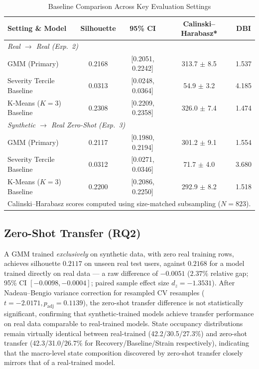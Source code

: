 \documentclass[conference]{IEEEtran}
\begin{document}
\begin{table}[!htb]
\caption{Baseline Comparison Across Key Evaluation Settings}
\label{tab:baselines}
\centering
\small
\setlength{\tabcolsep}{3pt}
\begin{tabular}{lcccc}
\toprule
\textbf{Setting \& Model} & \textbf{Silhouette} & \textbf{95\% CI} & \textbf{Calinski--Harabasz*} & \textbf{DBI} \\
\midrule
\multicolumn{5}{l}{\textit{Real $\rightarrow$ Real (Exp.~2)}} \\
GMM (Primary) & 0.2168 & [0.2051, 0.2242] & 313.7 $\pm$ 8.5 & 1.537 \\
Severity Tercile Baseline & 0.0313 & [0.0248, 0.0364] & 54.9 $\pm$ 3.2 & 4.185 \\
K-Means ($K{=}3$) Baseline & 0.2308 & [0.2209, 0.2358] & 326.0 $\pm$ 7.4 & 1.474 \\
\midrule
\multicolumn{5}{l}{\textit{Synthetic $\rightarrow$ Real Zero-Shot (Exp.~3)}} \\
GMM (Primary) & 0.2117 & [0.1980, 0.2194] & 301.2 $\pm$ 9.1 & 1.554 \\
Severity Tercile Baseline & 0.0312 & [0.0271, 0.0346] & 71.7 $\pm$ 4.0 & 3.680 \\
K-Means ($K{=}3$) Baseline & 0.2200 & [0.2086, 0.2250] & 292.9 $\pm$ 8.2 & 1.518 \\
\bottomrule
\multicolumn{5}{l}{\footnotesize *Calinski--Harabasz scores computed using size-matched subsampling ($N{=}823$).}
\end{tabular}
\end{table}

\subsection{Zero-Shot Transfer (RQ2)}

A GMM trained \emph{exclusively} on synthetic data, with zero real training rows, achieves silhouette $0.2117$ on unseen real test users, against $0.2168$ for a model trained directly on real data --- a raw difference of $-0.0051$ ($2.37\%$ relative gap; 95\% CI $[-0.0098, -0.0004]$; paired sample effect size $d_z = -1.3531$). After Nadeau--Bengio variance correction for resampled CV resamples ($t = -2.0171, p_{\text{adj}} = 0.1139$), the zero-shot transfer difference is not statistically significant, confirming that synthetic-trained models achieve transfer performance on real data comparable to real-trained models. State occupancy distributions remain virtually identical between real-trained (42.2/30.5/27.3\%) and zero-shot transfer (42.3/31.0/26.7\% for Recovery/Baseline/Strain respectively), indicating that the macro-level state composition discovered by zero-shot transfer closely mirrors that of a real-trained model.
\end{document}
